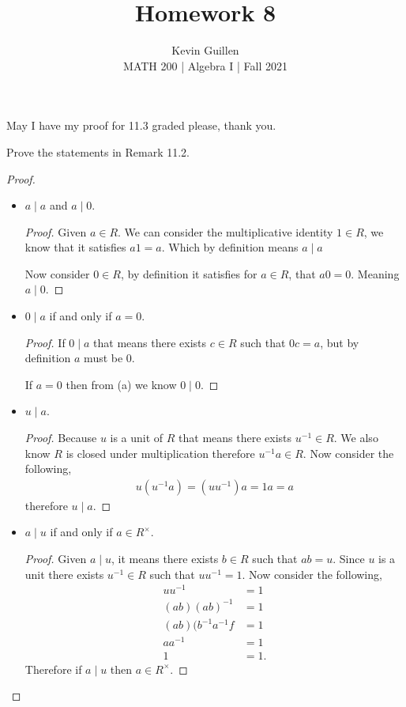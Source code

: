 \documentclass[11pt]{article}
\newenvironment{problem}[2][Problem\!]{\begin{trivlist}
\item[\hskip \labelsep {\bfseries #1}\hskip \labelsep {\bfseries #2}]}{\end{trivlist}}
\begin{document}
 
\title{Homework 8}
\author{Kevin Guillen\\[0.5em]
MATH 200 | Algebra I | Fall 2021}
\date{} 
\maketitle

May I have my proof for 11.3 graded please, thank you.

\begin{tcolorbox}
  \begin{problem} {11.1} Prove the statements in Remark 11.2.
  \end{problem}
\end{tcolorbox}
\begin{proof}
    \begin{itemize}
        \item[(a)] $a \mid a$ and $a \mid 0$.
        \begin{proof}
            Given $a \in R$. We can consider the multiplicative identity $1\in R$, we know that it satisfies $a1 = a$. Which by definition means $a \mid a$

            Now consider $0 \in R$, by definition it satisfies for $a \in R$, that $a0 = 0$. Meaning $a \mid 0$.
        \end{proof} 
        \item[(b)] $0 \mid a$ if and only if $a = 0$.
        \begin{proof}
            If $0 \mid a$ that means there exists $c \in R$ such that $0c = a$, but by definition $a$ must be 0. 

            If $a = 0$ then from (a) we know $0 \mid 0$. 
        \end{proof} 
        \item[(c)] $u \mid a$.
        \begin{proof}
            Because $u$ is a unit of $R$ that means there exists $u^{-1}\in R$. We also know $R$ is closed under multiplication therefore $u^{-1}a \in R$. Now consider the following,
            \begin{align*}
                u(u^{-1}a) = (uu^{-1})a = 1a = a
            \end{align*} 
            therefore $u\mid a$.
        \end{proof} 
        \item[(d)] $a \mid u$ if and only if $a \in R^{\times}$.
        \begin{proof}
            Given $a\mid u$, it means there exists $b \in R$ such that $ab = u$. Since $u$ is a unit there exists $u^{-1}\in R$ such that $uu^{-1} = 1$. Now consider the following,
            \begin{align*}
                uu^{-1} &= 1 \\
                (ab)(ab)^{-1} &= 1 \\
                (ab)(b^{-1}a^{-1}f &= 1 \\
                aa^{-1} &=1 \\
                1 &= 1. 
            \end{align*}
            Therefore if $a \mid u$ then $a \in R^{\times}$. 


\end{proof}
\end{itemize}
\end{proof}
\end{document}
